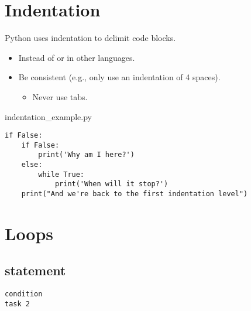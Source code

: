 \documentclass[aspectratio=1610,t]{beamer}
\begin{document}
\section{Indentation}
\begin{pframe}
 Python uses indentation to delimit code blocks.
 \begin{itemize}
   \item Instead of  or  in other languages.
   \item Be consistent (e.g., only use an indentation of 4 spaces).
   \begin{itemize}
     \item Never use tabs.
   \end{itemize}
 \end{itemize}
 \begin{pythonfile}{indentation\_example.py}
  \begin{verbatim}
if False:
    if False:
        print('Why am I here?')
    else:
        while True:
            print('When will it stop?')
    print("And we're back to the first indentation level")
  \end{verbatim}
 \end{pythonfile}
\end{pframe}



\section{Loops}

\begin{pframe}
 \begin{center}
  
 \end{center}
\end{pframe}


\subsection{ statement}
\begin{pframe}
 \begin{minipage}{0.47\textwidth}
 \begin{center}
  
 \end{center}
 \end{minipage}%
 \begin{minipage}{0.47\textwidth}
  \begin{pythondeclaration}
   \textvisiblespace\lstinline{condition}\emp{:}\\
   \textvisiblespace\textvisiblespace\textvisiblespace\textvisiblespace
   \lstinline{task 2}
  \end{pythondeclaration}
 \end{minipage}
\end{pframe}
\end{document}

